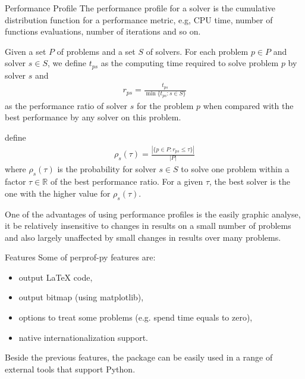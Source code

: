 \documentclass[]{beamer}
\begin{document}
\begin{frame}[t,fragile]
\begin{columns}[t]
\begin{column}{0.4\textwidth}
      \begin{block}{Performance Profile}
        The performance profile for a solver is the cumulative distribution
        function for a performance metric, e.g, CPU time, number of functions
        evaluations, number of iterations and so on.

        Given a set $P$ of problems and a set $S$ of solvers. For each problem $p
        \in P$ and solver $s \in S$, we define $t_{ps}$ as the computing time
        required to solve problem $p$ by solver $s$ and
        \begin{align*}
          r_{ps} = \frac{t_{ps}}{\min\{t_{ps}: s \in S\}}
        \end{align*}
        as the performance ratio of solver $s$ for the problem $p$ when compared
        with the best performance by any solver on this problem.

        \citeauthor{Dolan2001} define
        \begin{align*}
          \rho_s(\tau) = \frac{| \{p \in P: r_{ps} \leq \tau\} |}{| P |}
        \end{align*}
        where $\rho_s(\tau)$ is the probability for solver $s \in S$ to solve one
        problem within a factor $\tau \in \mathbb{R}$ of the best performance
        ratio. For a given $\tau$, the best solver is the one with the higher
        value for $\rho_s(\tau)$.

        One of the advantages of using performance profiles is the easily graphic
        analyse, it be relatively insensitive to changes in results on a small
        number of problems and also largely unaffected by small changes in
        results over many problems.
      \end{block}

      \begin{block}{Features}
        Some of perprof-py features are:
        \begin{itemize}
          \item output LaTeX code,
          \item output bitmap (using matplotlib),
          \item options to treat some problems (e.g. spend time equals to
            zero),
          \item native internationalization support.
        \end{itemize}

        Beside the previous features, the package can be easily used in a range
        of external tools that support Python.
      \end{block}


\end{column}
\end{columns}
\end{frame}
\end{document}
